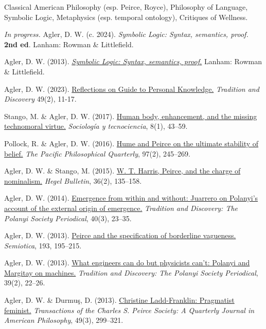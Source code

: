 \documentclass[p1noheader, 11pt]{../lightcv}
\begin{document}
Classical American Philosophy (esp. Peirce, Royce), Philosophy of Language, Symbolic Logic, Metaphysics (esp. temporal ontology), Critiques of Wellness.

\begin{rlist}[Books]
    \item \textit{In progress.} Agler, D. W. (c. 2024). \textit{Symbolic Logic: Syntax, semantics, proof.} \textbf{2nd ed}. Lanham: Rowman \& Littlefield.
    \item Agler, D. W. (2013). \textit{\href{https://rowman.com/ISBN/9781442217416}{Symbolic Logic: Syntax, semantics, proof.}} Lanham: Rowman \& Littlefield.
\end{rlist}

\begin{rlist}[Articles]
    \item Agler, D. W. (2023). \href{http://polanyisociety.org/TAD%20WEB%20ARCHIVE/TAD49-2/Agler-49-2.pdf}{Reflections on Guide to Personal Knowledge.} \textit{Tradition and Discovery} 49(2), 11-17.
    \item Stango, M. \& Agler, D. W. (2017). \href{https://revistas.uva.es/index.php/sociotecno/article/view/1707}{Human body, enhancement, and the missing technomoral virtue.} \textit{Sociología y tecnociencia}, 8(1), 43–59.
    \item Pollock, R. \& Agler, D. W. (2016). \href{http://onlinelibrary.wiley.com/doi/10.1111/papq.12118/abstract}{Hume and Peirce on the ultimate stability of belief.} \textit{The Pacific Philosophical Quarterly}, 97(2), 245–269.
    \item Agler, D. W. \& Stango, M. (2015). \href{http://dx.doi.org/10.1017/hgl.2015.15}{W. T. Harris, Peirce, and the charge of nominalism.} \textit{Hegel Bulletin}, 36(2), 135–158.
    \item Agler, D. W. (2014). \href{https://philpapers.org/rec/AGLEFW}{Emergence from within and without: Juarrero on Polanyi’s account of the external origin of emergence.} \textit{Tradition and Discovery: The Polanyi Society Periodical}, 40(3), 23–35.
    \item Agler, D. W. (2013). \href{https://doi.org/10.1515/sem-2013-0012}{Peirce and the specification of borderline vagueness.} \textit{Semiotica}, 193, 195–215.
    \item Agler, D. W. (2013). \href{https://philpapers.org/rec/AGLWEC}{What engineers can do but physicists can’t: Polanyi and Margitay on machines.} \textit{Tradition and Discovery: The Polanyi Society Periodical}, 39(2), 22–26.
    \item Agler, D. W. \& Durmuş, D. (2013). \href{https://muse.jhu.edu/article/536356/}{Christine Ladd-Franklin: Pragmatist feminist.} \textit{Transactions of the Charles S. Peirce Society: A Quarterly Journal in American Philosophy}, 49(3), 299–321.

\end{rlist}
\end{document}
